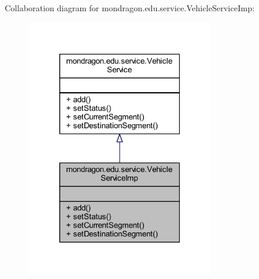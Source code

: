 Collaboration diagram for mondragon.\+edu.\+service.\+Vehicle\+Service\+Imp\+:\nopagebreak
\begin{figure}[H]
\begin{center}
\leavevmode
\includegraphics[width=232pt]{classmondragon_1_1edu_1_1service_1_1_vehicle_service_imp__coll__graph}
\end{center}
\end{figure}
